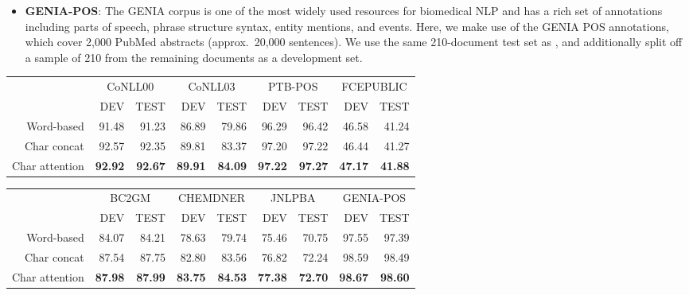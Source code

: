 \documentclass[11pt]{article}
\begin{document}
\begin{itemize}
\item \textbf{GENIA-POS}:
The GENIA corpus \cite{Ohta2002} is one of the most widely used resources for
biomedical NLP and has a rich set of annotations including parts of
speech, phrase structure syntax, entity mentions, and events. Here, we make use of the GENIA POS annotations,
which cover 2,000 PubMed abstracts (approx.\ 20,000 sentences).
We use the same 210-document test set as , and additionally split off a sample of 210 from the remaining
documents as a development set.

\end{itemize}


\begin{table*}
\setlength\tabcolsep{10.5pt}
\begin{tabular}{r|rr|rr|rr|rr} \toprule
 & \multicolumn{2}{c|}{CoNLL00} & \multicolumn{2}{c|}{CoNLL03}  & \multicolumn{2}{c|}{PTB-POS}  & \multicolumn{2}{c}{FCEPUBLIC} \\ 
 & {\small DEV} & {\small TEST} & {\small DEV} & {\small TEST} & {\small DEV} & {\small TEST} & {\small DEV} & {\small TEST} \\ \midrule
Word-based & 91.48 & 91.23 & 86.89 & 79.86 & 96.29 & 96.42 & 46.58 & 41.24 \\
Char concat & 92.57 & 92.35 & 89.81 & 83.37 & 97.20 & 97.22 & 46.44 & 41.27 \\
Char attention & \textbf{92.92} & \textbf{92.67} & \textbf{89.91} & \textbf{84.09} & \textbf{97.22} & \textbf{97.27} & \textbf{47.17} & \textbf{41.88} \\ \bottomrule
\end{tabular}

\vspace{0.7cm}

\begin{tabular}{r|rr|rr|rr|rr} \toprule
 & \multicolumn{2}{c|}{BC2GM} & \multicolumn{2}{c|}{CHEMDNER} & \multicolumn{2}{c|}{JNLPBA} & \multicolumn{2}{c}{GENIA-POS} \\ 
 & {\small DEV} & {\small TEST} & {\small DEV} & {\small TEST} & {\small DEV} & {\small TEST} & {\small DEV} & {\small TEST} \\ \midrule
Word-based & 84.07 & 84.21 & 78.63 & 79.74 & 75.46 & 70.75 & 97.55 & 97.39 \\
Char concat & 87.54 & 87.75 & 82.80 & 83.56 & 76.82 & 72.24 & 98.59 & 98.49 \\
Char attention & \textbf{87.98} & \textbf{87.99} & \textbf{83.75} & \textbf{84.53} & \textbf{77.38} & \textbf{72.70} & \textbf{98.67} & \textbf{98.60} \\ \bottomrule
\end{tabular}
\caption{Comparison of word-based and character-based sequence labeling architectures on 8 datasets. The evaluation measure used for each dataset is specified in Section \ref{sec:evaluation}.}
\label{tab:results}
\end{table*}
\end{document}
